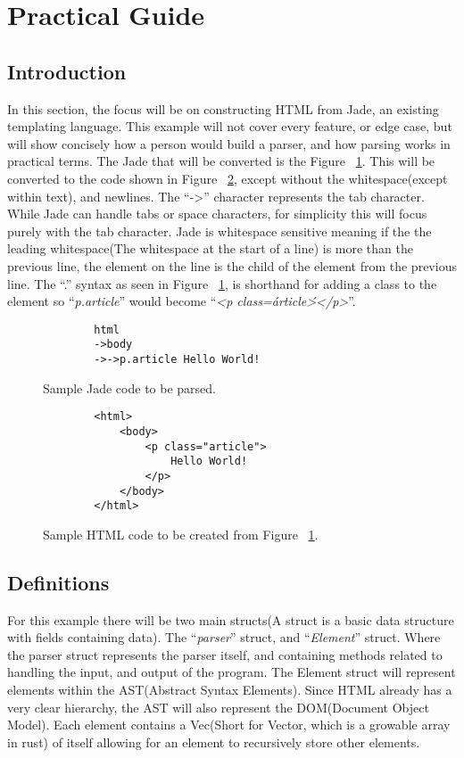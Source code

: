 \section{Practical Guide}

\subsection{Introduction}
In this section, the focus will be on constructing HTML from Jade, an existing templating language. This example will not cover every feature, or edge case, but will show concisely how a person would build a parser, and how parsing works in practical terms. The Jade that will be converted is the Figure ~\ref{fig:jade}. This will be converted to the code shown in Figure ~\ref{fig:html}, except without the whitespace(except within text), and newlines. The ``->'' character represents the tab character. While Jade can handle tabs or space characters, for simplicity this will focus purely with the tab character. Jade is whitespace sensitive meaning if the the leading whitespace(The whitespace at the start of a line) is more than the previous line, the element on the line is the child of the element from the previous line. The ``.'' syntax as seen in Figure ~\ref{fig:jade}, is shorthand for adding a class to the element so ``\textit{p.article}'' would become ``\textit{<p class=\'article\'></p>}''.

\begin{figure}[ht!]
    \begin{verbatim}
        html
        ->body
        ->->p.article Hello World!
    \end{verbatim}
    \caption{Sample Jade code to be parsed.}
    \label{fig:jade}
\end{figure}

\begin{figure}[ht!]
    \begin{verbatim}
        <html>
            <body>
                <p class="article">
                    Hello World!
                </p>
            </body>
        </html>
    \end{verbatim}
    \caption{Sample HTML code to be created from Figure ~\ref{fig:jade}.}
    \label{fig:html}
\end{figure}

\subsection{Definitions}
For this example there will be two main structs(A struct is a basic data structure with fields containing data). The ``\textit{parser}'' struct, and ``\textit{Element}'' struct. Where the parser struct represents the parser itself, and containing methods related to handling the input, and output of the program. The Element struct will represent elements within the AST(Abstract Syntax Elements). Since HTML already has a very clear hierarchy, the AST will also represent the DOM(Document Object Model). Each element contains a Vec(Short for Vector, which is a growable array in rust) of itself allowing for an element to recursively store other elements.


